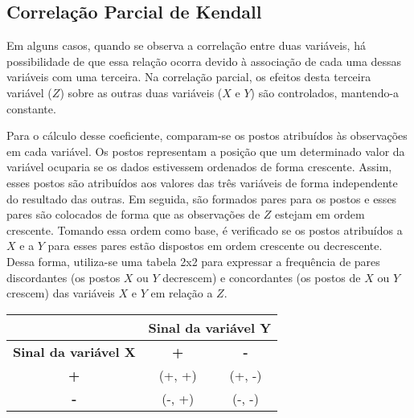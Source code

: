 \documentclass[
  portuguese,
]{estat/estat}
\begin{document}
\subsection{Correlação Parcial de
Kendall}\label{correlauxe7uxe3o-parcial-de-kendall}

Em alguns casos, quando se observa a correlação entre duas variáveis, há
possibilidade de que essa relação ocorra devido à associação de cada uma
dessas variáveis com uma terceira. Na correlação parcial, os efeitos
desta terceira variável (\(Z\)) sobre as outras duas variáveis (\(X\) e
\(Y\)) são controlados, mantendo-a constante.

Para o cálculo desse coeficiente, comparam-se os postos atribuídos às
observações em cada variável. Os postos representam a posição que um
determinado valor da variável ocuparia se os dados estivessem ordenados
de forma crescente. Assim, esses postos são atribuídos aos valores das
três variáveis de forma independente do resultado das outras. Em
seguida, são formados pares para os postos e esses pares são colocados
de forma que as observações de \(Z\) estejam em ordem crescente. Tomando
essa ordem como base, é verificado se os postos atribuídos a \(X\) e a
\(Y\) para esses pares estão dispostos em ordem crescente ou
decrescente. Dessa forma, utiliza-se uma tabela 2x2 para expressar a
frequência de pares discordantes (os postos \(X\) ou \(Y\) decrescem) e
concordantes (os postos de \(X\) ou \(Y\) crescem) das variáveis \(X\) e
\(Y\) em relação a \(Z\).

\begin{table}[H]
\centering
\begin{tabular}{c|cc}
\multicolumn{1}{l|}{}        & \multicolumn{2}{c}{\textbf{Sinal da variável Y}} \\ \midrule
\textbf{Sinal da variável X} & \textbf{+}              & \textbf{-}             \\ \midrule
\textbf{+}                   & (+, +)                  & (+, -)                 \\
\textbf{-}                   & (-, +)                  & (-, -)     
\end{tabular}
\end{table}

\end{document}
